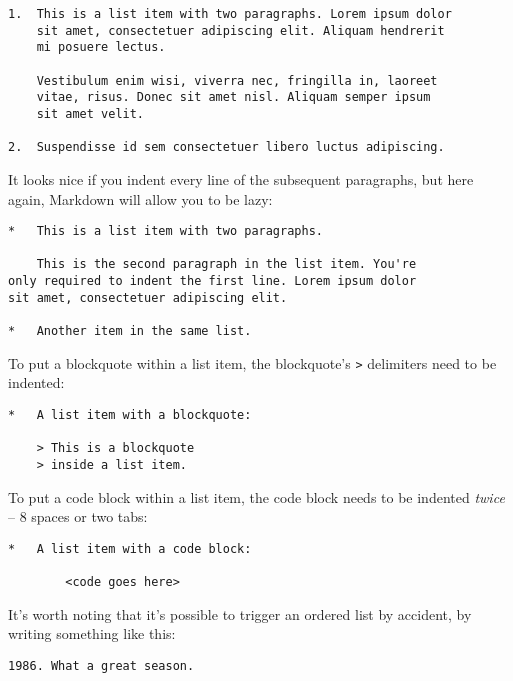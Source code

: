 \begin{lstlisting}
1.  This is a list item with two paragraphs. Lorem ipsum dolor
    sit amet, consectetuer adipiscing elit. Aliquam hendrerit
    mi posuere lectus.

    Vestibulum enim wisi, viverra nec, fringilla in, laoreet
    vitae, risus. Donec sit amet nisl. Aliquam semper ipsum
    sit amet velit.

2.  Suspendisse id sem consectetuer libero luctus adipiscing.
\end{lstlisting}




It looks nice if you indent every line of the subsequent
paragraphs, but here again, Markdown will allow you to be
lazy:

\begin{lstlisting}
*   This is a list item with two paragraphs.

    This is the second paragraph in the list item. You're
only required to indent the first line. Lorem ipsum dolor
sit amet, consectetuer adipiscing elit.

*   Another item in the same list.
\end{lstlisting}




To put a blockquote within a list item, the blockquote's \texttt{>}
delimiters need to be indented:

\begin{lstlisting}
*   A list item with a blockquote:

    > This is a blockquote
    > inside a list item.
\end{lstlisting}




To put a code block within a list item, the code block needs
to be indented \emph{twice} -- 8 spaces or two tabs:

\begin{lstlisting}
*   A list item with a code block:

        <code goes here>
\end{lstlisting}




It's worth noting that it's possible to trigger an ordered list by
accident, by writing something like this:

\begin{lstlisting}
1986. What a great season.
\end{lstlisting}




